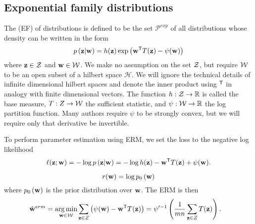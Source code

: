 \documentclass[thesis.tex]{subfiles}
\newcommand{\set}[1]{\mathcal {#1}}
\newcommand{\p}[1]{p\left({#1}\right)}
\newcommand{\prior}[1]{p_0\left({#1}\right)}
\newcommand{\Pdist}{\mathcal P}
\newcommand{\Pexp}{\Pdist^\textit{exp}}
\begin{document}

\subsection{Exponential family distributions}


The  (EF) of distributions is defined to be the set $\Pexp$ of all distributions whose density can be written in the form
\begin{equation}
    \p{\z | \w} = h(\z)\exp\left(\trans{\w} T(\z) - \psi(\w)\right)
\end{equation}
where $\mathbf z\in{\mathcal Z}$ and $\mathbf w\in{\mathcal W}$.
We make no assumption on the set ${\mathcal Z}$, but require ${\mathcal W}$ to be an open subset of a hilbert space $\set H$.
We will ignore the technical details of infinite dimensional hilbert spaces and denote the inner product using ${}^{\mathsf{T}}$ in analogy with finite dimensional vectors.
The function $h : {\mathcal Z}\to\mathbb R$ is called the base measure,
$T : Z \to {\mathcal W}$ the sufficient statistic,
and $\psi : {\mathcal W} \to \mathbb R$ the log partition function.
Many authors require $\psi$ to be strongly convex,
but we will require only that derivative be invertible.

To perform parameter estimation using ERM,
we set the loss to the negative log likelihood 
\begin{equation}
    \loss(\z;\w) 
    = -\log\p{\z|\w}
    = -\log h(\z) - \trans\w T(\z) + \psi(\w)
    .
\end{equation}

\begin{equation}
    \reg(\w) = \log\prior\w
\end{equation}
where $\prior\w$ is the prior distribution over $\mathbf w$.
The ERM is then
\newcommand{\deriv}[2]{\frac{\dd {#1}}{\dd {#2}}}
\begin{align}
    \label{eq:ef:erm}
    \hat{\mathbf w}^{erm} 
    &= \operatorname*{arg\,min}_{\mathbf w\in{\mathcal W}} \sum_{\mathbf z\in Z}\left( \psi(\mathbf w) - {\mathbf w}^{\mathsf{T}} T(\mathbf z)\right)
    = \psi'^{-1} \left(\frac{1}{mn} \sum_{\mathbf z\in Z} T(\mathbf z) \right)
    .
\end{align}
\end{document}
